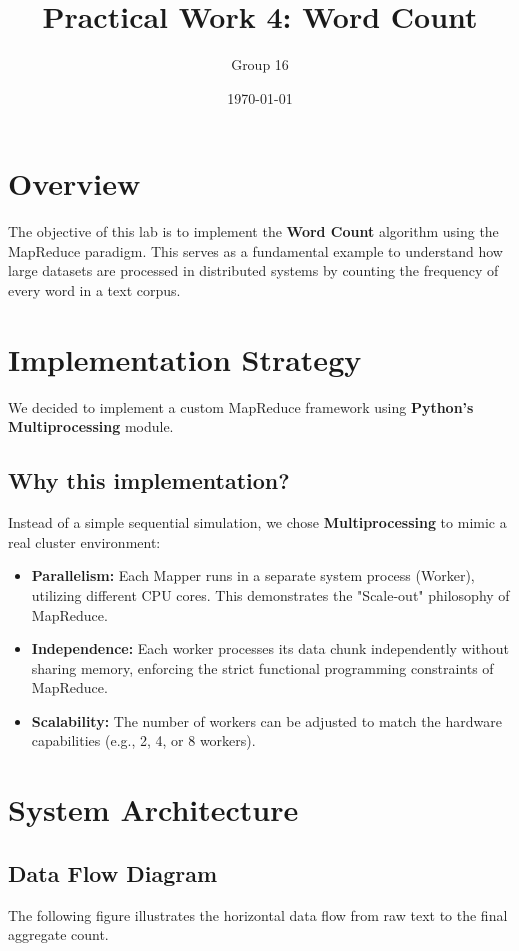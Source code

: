 \documentclass[a4paper,11pt]{article}
\title{\textbf{Practical Work 4: Word Count}}
\author{Group 16}
\date{\today}
\begin{document}
\maketitle

\section{Overview}
The objective of this lab is to implement the \textbf{Word Count} algorithm using the MapReduce paradigm. This serves as a fundamental example to understand how large datasets are processed in distributed systems by counting the frequency of every word in a text corpus.

\section{Implementation Strategy}
We decided to implement a custom MapReduce framework using \textbf{Python's Multiprocessing} module.

\subsection{Why this implementation?}
Instead of a simple sequential simulation, we chose \textbf{Multiprocessing} to mimic a real cluster environment:
\begin{itemize}
    \item \textbf{Parallelism:} Each Mapper runs in a separate system process (Worker), utilizing different CPU cores. This demonstrates the "Scale-out" philosophy of MapReduce.
    \item \textbf{Independence:} Each worker processes its data chunk independently without sharing memory, enforcing the strict functional programming constraints of MapReduce.
    \item \textbf{Scalability:} The number of workers can be adjusted to match the hardware capabilities (e.g., 2, 4, or 8 workers).
\end{itemize}

\section{System Architecture}

\subsection{Data Flow Diagram}
The following figure illustrates the horizontal data flow from raw text to the final aggregate count.
\end{document}
